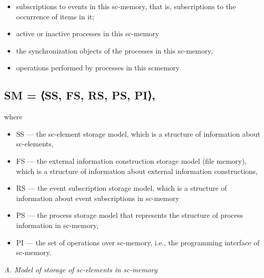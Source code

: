 \documentclass{article}
\begin{document}
\begin{multicols}{2}
\begin{itemize}
\end{itemize}
\begin{itemize}
\item subscriptions to events in this sc-memory, that is,
subscriptions to the occurrence of items in it;
\item  active or inactive processes in this sc-memory
\item the synchronization objects of the processes in this
sc-memory,
\item operations performed by processes in this scmemory
\end{itemize}
\begin{center}
  \subsection*{\textmd{ \normalsize{ SM = ⟨SS, FS, RS, PS, PI⟩,}}}
\end{center}
where
\begin{itemize}
\item SS — the sc-element storage model, which is a
structure of information about sc-elements,
\item  FS — the external information construction storage
model (file memory), which is a structure of information about external information constructions,
\item RS — the event subscription storage model, which
is a structure of information about event subscriptions in sc-memory
\item PS — the process storage model that represents the
structure of process information in sc-memory,
\item PI — the set of operations over sc-memory, i.e.,
the programming interface of sc-memory.
\end{itemize}
\textit{A. Model of storage of sc-elements in sc-memory}\par
{}\par
\begin{center}

\end{center}
\end{multicols}
\end{document}
